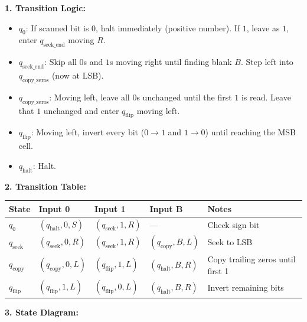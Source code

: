 \documentclass[11pt,a4paper]{article}
\begin{document}
\begin{solutionbox}
\textbf{1. Transition Logic:}
\begin{itemize}[leftmargin=*]
    \item $q_0$: If scanned bit is $0$, halt immediately (positive number). If $1$, leave as $1$, enter $q_{\text{seek\_end}}$ moving $R$.
    \item $q_{\text{seek\_end}}$: Skip all $0$s and $1$s moving right until finding blank $B$. Step left into $q_{\text{copy\_zeros}}$ (now at LSB).
    \item $q_{\text{copy\_zeros}}$: Moving left, leave all $0$s unchanged until the first $1$ is read. Leave that $1$ unchanged and enter $q_{\text{flip}}$ moving left.
    \item $q_{\text{flip}}$: Moving left, invert every bit ($0 \rightarrow 1$ and $1 \rightarrow 0$) until reaching the MSB cell.
    \item $q_{\text{halt}}$: Halt.
\end{itemize}

\textbf{2. Transition Table:}
\begin{center}
\small
\begin{tabular}{lllll}
\toprule
\textbf{State} & \textbf{Input 0} & \textbf{Input 1} & \textbf{Input B} & \textbf{Notes} \\
\midrule
$q_0$ & $(q_{\text{halt}}, 0, S)$ & $(q_{\text{seek}}, 1, R)$ & — & Check sign bit \\
$q_{\text{seek}}$ & $(q_{\text{seek}}, 0, R)$ & $(q_{\text{seek}}, 1, R)$ & $(q_{\text{copy}}, B, L)$ & Seek to LSB \\
$q_{\text{copy}}$ & $(q_{\text{copy}}, 0, L)$ & $(q_{\text{flip}}, 1, L)$ & $(q_{\text{halt}}, B, R)$ & Copy trailing zeros until first 1 \\
$q_{\text{flip}}$ & $(q_{\text{flip}}, 1, L)$ & $(q_{\text{flip}}, 0, L)$ & $(q_{\text{halt}}, B, R)$ & Invert remaining bits \\
\bottomrule
\end{tabular}
\end{center}

\textbf{3. State Diagram:}
\begin{center}
\end{center}
\end{solutionbox}
\end{document}
